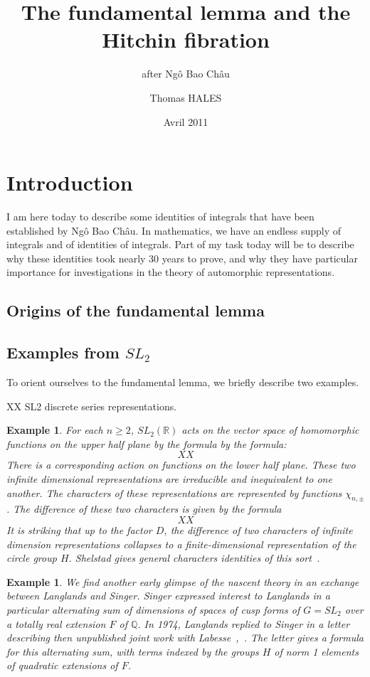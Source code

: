 \documentclass[brochure,english,12pt]{bourbaki}
\date{Avril 2011}
\title{The fundamental lemma and the Hitchin fibration}
\subtitle{after Ng\^o Bao Ch\^au}
\author{Thomas HALES}
\newtheorem{example}[equation]{Example}
\newcommand{\ring}[1]{\mathbb{#1}}
\newcommand{\NBC}{Ng\^o Bao Ch\^au}
\begin{document}
\maketitle


\section{Introduction}

I am here today to describe some identities of integrals that have been established
by \NBC.  In mathematics, we have an endless supply of integrals and of identities of integrals.  Part of my task today will be to describe why these identities took nearly 30 years to prove, and why they have particular importance for investigations in the theory of automorphic representations.






\subsection{Origins of the fundamental lemma}

\subsection{Examples from $SL_2$}

To orient ourselves to the fundamental lemma, we 
briefly describe two examples.

XX SL2 discrete series representations.

\begin{example}  For each $n\ge 2$, 
$SL_2(\ring{R})$ acts on the vector space of homomorphic functions on the
upper half plane by the formula by the formula:
\[
XX
\]
There is a corresponding action on functions on the lower half plane.  These
two infinite dimensional representations are irreducible and inequivalent to
one another.  The characters of these representations are represented by functions
$\chi_{n,\pm}$.   The difference of these two characters is given by the
formula
\[
XX
\]
It is striking that up to the factor $D$, the difference of two characters of infinite dimension representations collapses to a finite-dimensional representation of the circle group $H$.  Shelstad gives general characters identities of this sort~\cite{Sh}.
\end{example}

\begin{example}
We find another early glimpse of the nascent theory in an exchange between Langlands and Singer.  Singer
expressed interest to Langlands in a particular alternating sum of
dimensions of spaces of cusp forms of $G=SL_2$ over a totally real
extension $F$ of $\ring{Q}$.  In 1974, Langlands replied to Singer in
a letter describing then unpublished joint work with
Labesse~\cite{Singer},~\cite{LL}.  The letter gives a formula for
this alternating sum, with terms indexed by the groups $H$ of norm 1
elements of quadratic extensions of $F$.  
\end{example}
\end{document}
